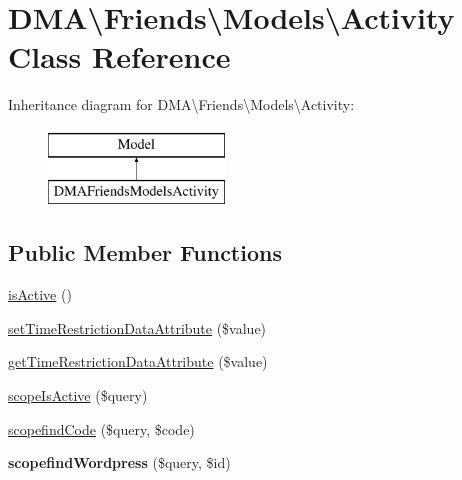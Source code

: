 \hypertarget{classDMA_1_1Friends_1_1Models_1_1Activity}{\section{D\+M\+A\textbackslash{}Friends\textbackslash{}Models\textbackslash{}Activity Class Reference}
\label{classDMA_1_1Friends_1_1Models_1_1Activity}
}
Inheritance diagram for D\+M\+A\textbackslash{}Friends\textbackslash{}Models\textbackslash{}Activity\+:\begin{figure}[H]
\begin{center}
\leavevmode
\includegraphics[height=2.000000cm]{dc/d8c/classDMA_1_1Friends_1_1Models_1_1Activity}
\end{center}
\end{figure}
\subsection*{Public Member Functions}
\begin{DoxyCompactItemize}
\item 
\hyperlink{classDMA_1_1Friends_1_1Models_1_1Activity_aa5a4543ce44bd5b87fee0651c2102daf}{is\+Active} ()
\item 
\hyperlink{classDMA_1_1Friends_1_1Models_1_1Activity_ade0ffca24448c217def365d104e52866}{set\+Time\+Restriction\+Data\+Attribute} (\$value)
\item 
\hyperlink{classDMA_1_1Friends_1_1Models_1_1Activity_a98a904c739aca30f2a26152a481164b6}{get\+Time\+Restriction\+Data\+Attribute} (\$value)
\item 
\hyperlink{classDMA_1_1Friends_1_1Models_1_1Activity_acd3f12824d95be07b5221cdc9d64abf7}{scope\+Is\+Active} (\$query)
\item 
\hyperlink{classDMA_1_1Friends_1_1Models_1_1Activity_a9bb36aab36ff22a29b2a594617dd591c}{scopefind\+Code} (\$query, \$code)
\item 
\hypertarget{classDMA_1_1Friends_1_1Models_1_1Activity_a5a533a3f638f99d1dd0a8e0550def49e}{{\bfseries scopefind\+Wordpress} (\$query, \$id)}\label{classDMA_1_1Friends_1_1Models_1_1Activity_a5a533a3f638f99d1dd0a8e0550def49e}

\end{DoxyCompactItemize}
